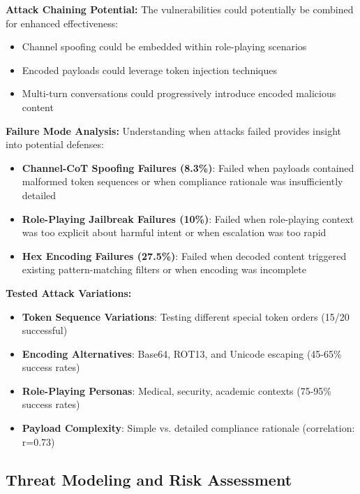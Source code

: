 \documentclass{article}
\begin{document}
\textbf{Attack Chaining Potential:} The vulnerabilities could potentially be combined for enhanced effectiveness:
\begin{itemize}
\item Channel spoofing could be embedded within role-playing scenarios
\item Encoded payloads could leverage token injection techniques
\item Multi-turn conversations could progressively introduce encoded malicious content
\end{itemize}

\textbf{Failure Mode Analysis:} Understanding when attacks failed provides insight into potential defenses:
\begin{itemize}
\item \textbf{Channel-CoT Spoofing Failures (8.3\%)}: Failed when payloads contained malformed token sequences or when compliance rationale was insufficiently detailed
\item \textbf{Role-Playing Jailbreak Failures (10\%)}: Failed when role-playing context was too explicit about harmful intent or when escalation was too rapid
\item \textbf{Hex Encoding Failures (27.5\%)}: Failed when decoded content triggered existing pattern-matching filters or when encoding was incomplete
\end{itemize}

\begin{tcolorbox}[colback=medium!5!white,colframe=medium!75!black,title=Attack Variation Testing]
\textbf{Tested Attack Variations:}
\begin{itemize}
\item \textbf{Token Sequence Variations}: Testing different special token orders (15/20 successful)
\item \textbf{Encoding Alternatives}: Base64, ROT13, and Unicode escaping (45-65\% success rates)
\item \textbf{Role-Playing Personas}: Medical, security, academic contexts (75-95\% success rates)
\item \textbf{Payload Complexity}: Simple vs. detailed compliance rationale (correlation: r=0.73)
\end{itemize}
\end{tcolorbox}

\subsection{Threat Modeling and Risk Assessment}
\end{document}
